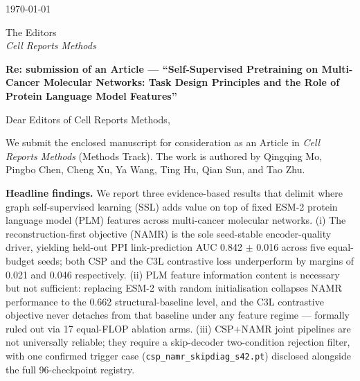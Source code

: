 \documentclass[11pt,a4paper]{article}
\begin{document}
\noindent\today

\medskip
\noindent The Editors\\
\textit{Cell Reports Methods}

\medskip
\noindent\textbf{Re: submission of an Article --- ``Self-Supervised Pretraining on Multi-Cancer Molecular Networks: Task Design Principles and the Role of Protein Language Model Features''}

\medskip
Dear Editors of Cell Reports Methods,

We submit the enclosed manuscript for consideration as an Article in \textit{Cell Reports Methods} (Methods Track). The work is authored by Qingqing Mo, Pingbo Chen, Cheng Xu, Ya Wang, Ting Hu, Qian Sun, and Tao Zhu.

\textbf{Headline findings.} We report three evidence-based results that delimit where graph self-supervised learning (SSL) adds value on top of fixed ESM-2 protein language model (PLM) features across multi-cancer molecular networks. (i) The reconstruction-first objective (NAMR) is the sole seed-stable encoder-quality driver, yielding held-out PPI link-prediction AUC 0.842 $\pm$ 0.016 across five equal-budget seeds; both CSP and the C3L contrastive loss underperform by margins of 0.021 and 0.046 respectively. (ii) PLM feature information content is necessary but not sufficient: replacing ESM-2 with random initialisation collapses NAMR performance to the 0.662 structural-baseline level, and the C3L contrastive objective never detaches from that baseline under any feature regime --- formally ruled out via 17 equal-FLOP ablation arms. (iii) CSP$+$NAMR joint pipelines are not universally reliable; they require a skip-decoder two-condition rejection filter, with one confirmed trigger case (\texttt{csp\_namr\_skipdiag\_s42.pt}) disclosed alongside the full 96-checkpoint registry.
\end{document}
